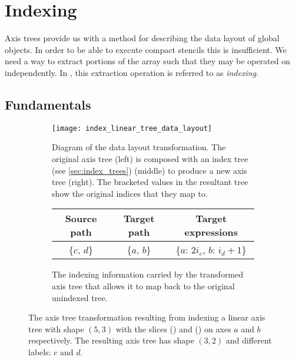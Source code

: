 \documentclass[thesis]{subfiles}
\begin{document}

\chapter{Indexing}

Axis trees provide us with a method for describing the data layout of global objects.
In order to be able to execute compact stencils this is insufficient.
We need a way to extract portions of the array such that they may be operated on independently.
In , this extraction operation is referred to as \textit{indexing}.

\section{Fundamentals}

\begin{figure}
  \centering
  \begin{subfigure}{\textwidth}
    \centering
    \texttt{[image: index\_linear\_tree\_data\_layout]}
    \caption{
      Diagram of the data layout transformation.
      The original axis tree (left) is composed with an index tree (see \cref{sec:index_trees}) (middle) to produce a new axis tree (right).
      The bracketed values in the resultant tree show the original indices that they map to.
    }
    \label{fig:index_linear_tree_data_layout}
  \end{subfigure}

  \vspace{1em}

  \begin{subfigure}{\textwidth}
    \centering
    \begin{tabular}{c|c|c}
      \textbf{Source path} & \textbf{Target path} & \textbf{Target expressions} \\
      \hline
      \{$c$, $d$\} & \{$a$, $b$\} & \{$a$: $2 i_c$, $b$: $i_d+1$\} \\
    \end{tabular}
    \caption{
      The indexing information carried by the transformed axis tree that allows it to map back to the original unindexed tree.
    }
    \label{fig:index_linear_tree_exprs}
  \end{subfigure}

  \caption{
    The axis tree transformation resulting from indexing a linear axis tree with shape $(5, 3)$ with the slices () and () on axes $a$ and $b$ respectively.
    The resulting axis tree has shape $(3, 2)$ and different labels: $c$ and $d$.
  }
  \label{fig:index_linear_tree_all}
\end{figure}
\end{document}

